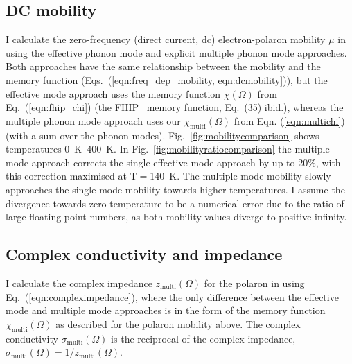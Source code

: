 \subsection{DC mobility} \label{Sec:compmobility}

I calculate the zero-frequency (direct current, dc) electron-polaron mobility $\mu$ in  using the effective phonon mode and explicit multiple phonon mode approaches. Both approaches have the same relationship between the mobility and the memory function (Eqs.~(\ref{eqn:freq_dep_mobility, eqn:dcmobility})), but the effective mode approach uses the memory function $\chi(\Omega)$ from Eq.~(\ref{eqn:fhip_chi}) (the FHIP~\cite{feynman_mobility_1962} memory function, Eq.~(35) ibid.), whereas the multiple phonon mode approach uses our $\chi_{\textrm{multi}}(\Omega)$ from Eqn. (\ref{eqn:multichi}) (with a sum over the phonon modes). Fig.~\ref{fig:mobilitycomparison} shows temperatures \SIrange{0}{400}{\kelvin}. In Fig.~\ref{fig:mobilityratiocomparison} the multiple mode approach corrects the single effective mode approach by up to 20\%, with this correction maximised at T$ = $\SI{140}{\kelvin}. The multiple-mode mobility slowly approaches the single-mode mobility towards higher temperatures. I assume the divergence towards zero temperature to be a numerical error due to the ratio of large floating-point numbers, as both mobility values diverge to positive infinity.

\subsection{Complex conductivity and impedance} \label{Sec:compconduct}

I calculate the complex impedance $z_{\textrm{multi}}(\Omega)$ for the polaron in  using Eq.~(\ref{eqn:compleximpedance}), where the only difference between the effective mode and multiple mode approaches is in the form of the memory function $\chi_{\textrm{multi}}(\Omega)$ as described for the polaron mobility above. The complex conductivity $\sigma_{\textrm{multi}}(\Omega)$ is the reciprocal of the complex impedance, $\sigma_{\textrm{multi}} (\Omega) = 1 / z_{\textrm{multi}}(\Omega)$.

